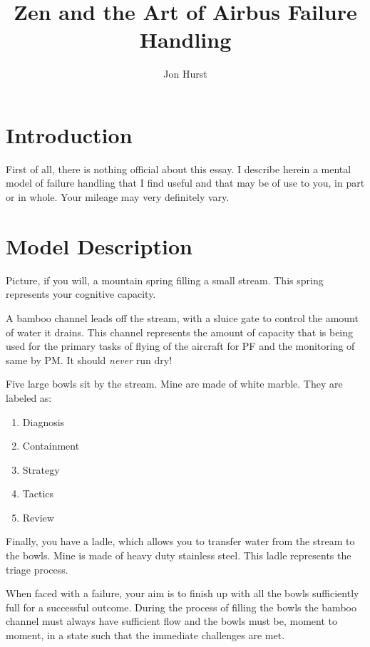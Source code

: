 \documentclass[a4paper,12pt]{article}
\title{Zen and the Art of Airbus Failure Handling}
\author{Jon Hurst}
\begin{document}
\maketitle

\section{Introduction}

First of all, there is nothing official about this essay. I describe
herein a mental model of failure handling that I find useful and that
may be of use to you, in part or in whole. Your mileage may very
definitely vary.

\section{Model Description}

Picture, if you will, a mountain spring filling a small stream. This
spring represents your cognitive capacity.

A bamboo channel leads off the stream, with a sluice gate to control the
amount of water it drains. This channel represents the amount of
capacity that is being used for the primary tasks of flying of the
aircraft for PF and the monitoring of same by PM. It should \emph{never}
run dry!

Five large bowls sit by the stream. Mine are made of white marble. They
are labeled as:

\begin{enumerate}
\item Diagnosis
\item Containment
\item Strategy
\item Tactics
\item Review
\end{enumerate}

Finally, you have a ladle, which allows you to transfer water from the
stream to the bowls. Mine is made of heavy duty stainless steel. This
ladle represents the triage process.

When faced with a failure, your aim is to finish up with all the bowls
sufficiently full for a successful outcome. During the process of
filling the bowls the bamboo channel must always have sufficient
flow and the bowls must be, moment to moment, in a state such that the
immediate challenges are met.

\end{document}
